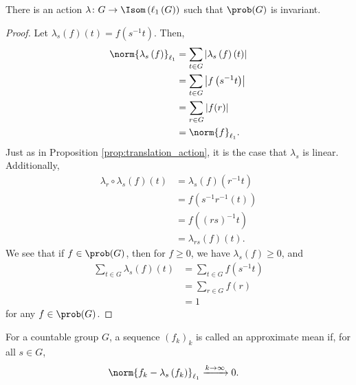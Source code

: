 \begin{proposition}
  There is an action $\lambda\colon G\rightarrow \Isom\left(\ell_{1}\left(G\right)\right)$ such that $\prob(G)$ is invariant.
\end{proposition}
\begin{proof}
  Let $\lambda_s\left(f\right)\left(t\right) = f\left(s^{-1}t\right)$. Then,
  \begin{align*}
    \norm{\lambda_s\left(f\right)}_{\ell_1} &= \sum_{t\in G}\left\vert \lambda_s\left(f\right)\left(t\right) \right\vert\\
                                     &= \sum_{t\in G}\left\vert f\left(s^{-1}t\right) \right\vert\\
                                     &= \sum_{r\in G}\left\vert f(r) \right\vert\\
                                     &= \norm{f}_{\ell_1}.
  \end{align*}
  Just as in Proposition \ref{prop:translation_action}, it is the case that $\lambda_s$ is linear. Additionally,
  \begin{align*}
    \lambda_r\circ \lambda_s\left(f\right)\left(t\right) &= \lambda_s\left(f\right)\left(r^{-1}t\right)\\
                                                         &= f\left(s^{-1}r^{-1}\left(t\right)\right)\\
                                                         &= f\left(\left(rs\right)^{-1}t\right)\\
                                                         &= \lambda_{rs}\left(f\right)\left(t\right).
  \end{align*}
  We see that if $f\in \prob(G)$, then for $f\geq 0$, we have $\lambda_s\left(f\right) \geq 0$, and
  \begin{align*}
    \sum_{t\in G}\lambda_s\left(f\right)\left(t\right) &= \sum_{t\in G}f\left(s^{-1}t\right)\\
                                                       &= \sum_{r\in G}f\left(r\right)\\
                                                       &= 1
  \end{align*}
  for any $f\in \prob(G)$.
\end{proof}
\begin{definition}\label{def:approximate_mean}
  For a countable group $G$, a sequence $\left(f_k\right)_k$ is called an approximate mean if, for all $s\in G$,
  \begin{align*}
    \norm{f_k - \lambda_s\left(f_k\right)}_{\ell_1} &\xrightarrow{k\rightarrow \infty}0.
  \end{align*}
\end{definition}
